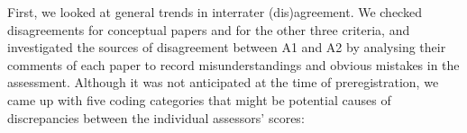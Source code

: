 \documentclass{josis}
\begin{document}
First, we looked at general trends in interrater (dis)agreement.
We checked disagreements for conceptual papers and for the other three criteria, and investigated the sources of disagreement between A1 and A2 by analysing their comments of each paper to record misunderstandings and obvious mistakes in the assessment. Although it was not anticipated at the time of preregistration, we came up with five coding categories that might be potential causes of discrepancies between the individual assessors' scores:
\end{document}
